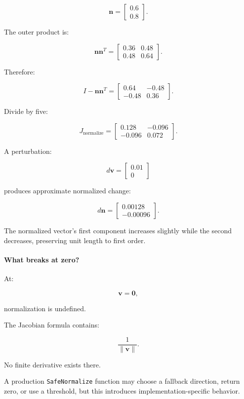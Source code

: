 \[
\mathbf n= \begin{bmatrix} 0.6\\0.8 \end{bmatrix}.
\]

The outer product is:

\[
\mathbf n\mathbf n^T= \begin{bmatrix} 0.36&0.48\\ 0.48&0.64 \end{bmatrix}.
\]

Therefore:

\[
I-\mathbf n\mathbf n^T= \begin{bmatrix} 0.64&-0.48\\ -0.48&0.36 \end{bmatrix}.
\]

Divide by five:

\[
\boxed{ J_{\mathrm{normalize}}= \begin{bmatrix} 0.128&-0.096\\ -0.096&0.072 \end{bmatrix} }.
\]

A perturbation:

\[
d\mathbf v= \begin{bmatrix} 0.01\\0 \end{bmatrix}
\]

produces approximate normalized change:

\[
d\mathbf n = \begin{bmatrix} 0.00128\\-0.00096 \end{bmatrix}.
\]

The normalized vector's first component increases slightly while the second decreases, preserving unit length to first order.

\paragraph{What breaks at zero?}\label{02-foundations-ii-ch027-what-breaks-at-zero}

At:

\[
\mathbf v=\mathbf0,
\]

normalization is undefined.

The Jacobian formula contains:

\[
\frac1{\|\mathbf v\|}.
\]

No finite derivative exists there.

A production \texttt{SafeNormalize} function may choose a fallback direction, return zero, or use a threshold, but this introduces implementation-specific behavior.

